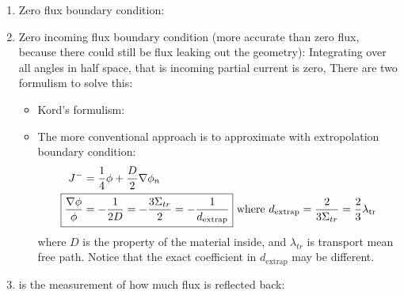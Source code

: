 \documentclass{school-22.211-notes}
\begin{document}
\clearpage
{}
\begin{enumerate}
\item Zero flux boundary condition:

\item Zero incoming flux boundary condition (more accurate than zero flux, because there could still be flux leaking out the geometry):
Integrating over all angles in half space, that is incoming partial current is zero, 
There are two formulism to solve this:
  \begin{itemize}
  \item Kord's formulism: 
  \item The more conventional approach is to approximate with extropolation boundary condition: 
    \begin{align}
      J^- &= \frac{1}{4} \phi + \frac{D}{2} \gradient \phi_n \\
      \Aboxed{ \frac{\gradient \phi}{\phi} &= - \frac{1}{2D} = - \frac{3\Sigma_{tr}}{2} = - \frac{1}{d_{\mathrm{extrap}}}} 
\mbox{   where } d_{\mathrm{extrap}} = \frac{2}{3 \Sigma_{tr}}  = \frac{2}{3} \lambda_{\mathrm{tr}}
    \end{align}
    where $D$ is the property of the material inside, and $\lambda_{tr}$ is transport mean free path. Notice that the exact coefficient in $d_{\mathrm{extrap}}$ may be different. 
  \end{itemize}

\item {} is the measurement of how much flux is reflected back: 

\end{enumerate}
\end{document}
